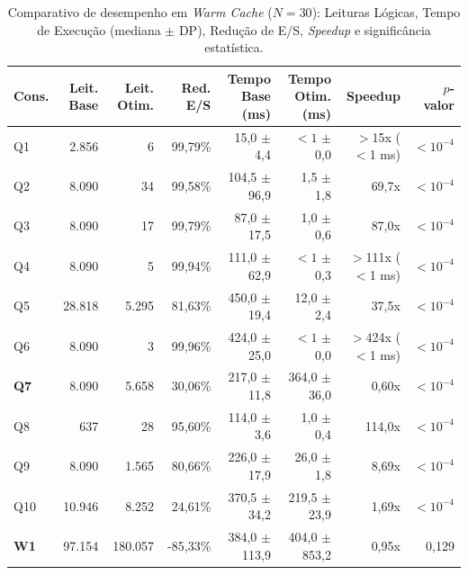 \begin{table}[ht]
\centering
\caption{Comparativo de desempenho em \textit{Warm Cache} ($N=30$): Leituras Lógicas, Tempo de Execução (mediana $\pm$ DP), Redução de E/S, \textit{Speedup} e significância estatística.}
\label{tab:resultados-warm}
\scriptsize
\setlength{\tabcolsep}{3.5pt}
\begin{tabular}{lrrrrrrr}
\toprule
\textbf{Cons.} & \textbf{Leit. Base} & \textbf{Leit. Otim.} & \textbf{Red. E/S} & \textbf{Tempo Base (ms)} & \textbf{Tempo Otim. (ms)} & \textbf{Speedup} & \textbf{$p$-valor} \\
\midrule
Q1 & 2.856 & 6 & 99,79\% & 15,0 $\pm$ 4,4 & $<1$ $\pm$ 0,0 & $>$15x ($<$1 ms) & $<10^{-4}$ \\
Q2 & 8.090 & 34 & 99,58\% & 104,5 $\pm$ 96,9 & 1,5 $\pm$ 1,8 & 69,7x & $<10^{-4}$ \\
Q3 & 8.090 & 17 & 99,79\% & 87,0 $\pm$ 17,5 & 1,0 $\pm$ 0,6 & 87,0x & $<10^{-4}$ \\
Q4 & 8.090 & 5 & 99,94\% & 111,0 $\pm$ 62,9 & $<1$ $\pm$ 0,3 & $>$111x ($<$1 ms) & $<10^{-4}$ \\
Q5 & 28.818 & 5.295 & 81,63\% & 450,0 $\pm$ 19,4 & 12,0 $\pm$ 2,4 & 37,5x & $<10^{-4}$ \\
Q6 & 8.090 & 3 & 99,96\% & 424,0 $\pm$ 25,0 & $<1$ $\pm$ 0,0 & $>$424x ($<$1 ms) & $<10^{-4}$ \\
\textbf{Q7} & 8.090 & 5.658 & 30,06\% & 217,0 $\pm$ 11,8 & 364,0 $\pm$ 36,0 & 0,60x & $<10^{-4}$ \\
Q8 & 637 & 28 & 95,60\% & 114,0 $\pm$ 3,6 & 1,0 $\pm$ 0,4 & 114,0x & $<10^{-4}$ \\
Q9 & 8.090 & 1.565 & 80,66\% & 226,0 $\pm$ 17,9 & 26,0 $\pm$ 1,8 & 8,69x & $<10^{-4}$ \\
Q10 & 10.946 & 8.252 & 24,61\% & 370,5 $\pm$ 34,2 & 219,5 $\pm$ 23,9 & 1,69x & $<10^{-4}$ \\
\midrule
\textbf{W1} & 97.154 & 180.057 & -85,33\% & 384,0 $\pm$ 113,9 & 404,0 $\pm$ 853,2 & 0,95x & 0,129 \\
\bottomrule
\end{tabular}
\end{table}

